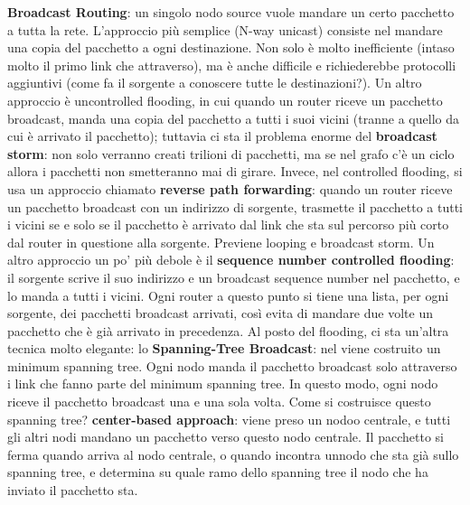 \documentclass[a4paper,10pt]{article} %
\renewcommand{\b}[1]{%
    {\textbf{#1}}}
\begin{document}
\b{Broadcast Routing}: un singolo nodo source vuole mandare un certo pacchetto a tutta la rete. L'approccio più semplice (N-way unicast) consiste nel mandare una copia del pacchetto a ogni destinazione. Non solo è molto inefficiente (intaso molto il primo link che attraverso), ma è anche difficile e richiederebbe protocolli aggiuntivi (come fa il sorgente a conoscere tutte le destinazioni?). Un altro approccio è uncontrolled flooding, in cui quando un router riceve un pacchetto broadcast, manda una copia del pacchetto a tutti i suoi vicini (tranne a quello da cui è arrivato il pacchetto); tuttavia ci sta il problema enorme del \b{broadcast storm}: non solo verranno creati trilioni di pacchetti, ma se nel grafo c'è un ciclo allora i pacchetti non smetteranno mai di girare. Invece, nel controlled flooding, si usa un approccio chiamato \b{reverse path forwarding}: quando un router riceve un pacchetto broadcast con un indirizzo di sorgente, trasmette il pacchetto a tutti i vicini se e solo se il pacchetto è arrivato dal link che sta sul percorso più corto dal router in questione alla sorgente. Previene looping e broadcast storm. Un altro approccio un po' più debole è il \b{sequence number controlled flooding}: il sorgente scrive il suo indirizzo e un broadcast sequence number nel pacchetto, e lo manda a tutti i vicini. Ogni router a questo punto si tiene una lista, per ogni sorgente, dei pacchetti broadcast arrivati, così evita di mandare due volte un pacchetto che è già arrivato in precedenza. Al posto del flooding, ci sta un'altra tecnica molto elegante: lo \b{Spanning-Tree Broadcast}: nel viene costruito un minimum spanning tree. Ogni nodo manda il pacchetto broadcast solo attraverso i link che fanno parte del minimum spanning tree. In questo modo, ogni nodo riceve il pacchetto broadcast una e una sola volta. Come si costruisce questo spanning tree? \b{center-based approach}: viene preso un nodoo centrale, e tutti gli altri nodi mandano un pacchetto verso questo nodo centrale. Il pacchetto si ferma quando arriva al nodo centrale, o quando incontra unnodo che sta già sullo spanning tree, e determina su quale ramo dello spanning tree il nodo che ha inviato il pacchetto sta.
\end{document}
